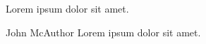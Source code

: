 \begin{pull}
Lorem ipsum dolor sit amet.
\end{pull}

\begin{pull}{John McAuthor}
Lorem ipsum dolor sit amet.
\end{pull}

